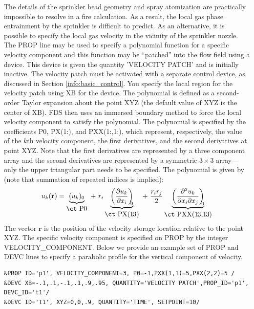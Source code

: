 \documentclass[11pt]{book}
\begin{document}
The details of the sprinkler head geometry and spray atomization are practically impossible to resolve in a fire calculation.  As a result, the local gas phase entrainment by the sprinkler is difficult to predict.  As an alternative, it is possible to specify the local gas velocity in the vicinity of the sprinkler nozzle.  The {\ct PROP} line may be used to specify a polynomial function for a specific velocity component and this function may be ``patched'' into the flow field using a device.  This device is given the quantity {\ct 'VELOCITY PATCH'} and is initially inactive.  The velocity patch must be activated with a separate control device, as discussed in Section \ref{info:basic_control}.  You specify the local region for the velocity patch using {\ct XB} for the device.  The polynomial is defined as a second-order Taylor expansion about the point {\ct XYZ} (the default value of {\ct XYZ} is the center of {\ct XB}).  FDS then uses an immersed boundary method to force the local velocity component to satisfy the polynomial.  The polynomial is specified by the coefficients {\ct P0}, {\ct PX(1\!:)}, and {\ct PXX(1\!:,1\!:)}, which represent, respectively, the value of the $k$th velocity component, the first derivatives, and the second derivatives at point {\ct XYZ}.  Note that the first derivatives are represented by a three component array and the second derivatives are represented by a symmetric $3 \times 3$ array---only the upper triangular part needs to be specified.  The polynomial is given by (note that summation of repeated indices is implied):
\begin{equation}
u_k(\mathbf{r}) = \underbrace{(u_k)_0}_{\mbox{\ct P0}} \,\,+\,\, r_i \underbrace{\left( \frac{\partial u_k}{\partial x_i} \right)_{\!\!\!0}}_{\mbox{\ct PX(1\!:\!3)}} \,\,+\,\,\frac{ r_i r_j}{2} \underbrace{\left(\frac{\partial^2 u_k}{\partial x_i \partial x_j}\right)_{\!\!\!0}}_{\mbox{\ct PXX(1\!:\!3,1\!:\!3)}}
\end{equation}
The vector $\mathbf{r}$ is the position of the velocity storage location relative to the point {\ct XYZ}.  The specific velocity component is specified on {\ct PROP} by the integer {\ct VELOCITY\_COMPONENT}.  Below we provide an example set of {\ct PROP} and {\ct DEVC} lines to specify a parabolic profile for the vertical component of velocity.

\begin{lstlisting}
&PROP ID='p1', VELOCITY_COMPONENT=3, P0=-1,PXX(1,1)=5,PXX(2,2)=5 /
&DEVC XB=-.1,.1,-.1,.1,.9,.95, QUANTITY='VELOCITY PATCH',PROP_ID='p1', DEVC_ID='t1'/
&DEVC ID='t1', XYZ=0,0,.9, QUANTITY='TIME', SETPOINT=10/
\end{lstlisting}
\end{document}
